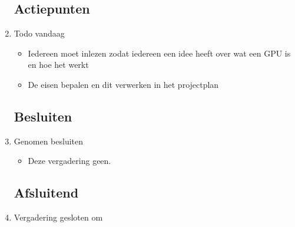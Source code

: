 \documentclass{article}
\begin{document}
\begin{enumerate}
	\subsection*{Actiepunten}
	\item Todo vandaag
	\begin{itemize}
		\item Iedereen moet inlezen zodat iedereen een idee heeft over wat een GPU is en hoe het werkt
		\item De eisen bepalen en dit verwerken in het projectplan
	\end{itemize}

	\subsection*{Besluiten}
	\item Genomen besluiten
	\begin{itemize}
		\item Deze vergadering geen.
	\end{itemize}

	\noindent 
	\subsection*{Afsluitend}
	\item Vergadering gesloten om %

\end{enumerate}
\end{document}
